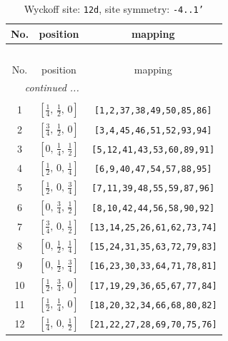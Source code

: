\documentclass[fleqn,8pt]{jsarticle}
\begin{document}
\begin{longtable}{ccc}
\caption{Wyckoff site: {\tt 12d}, site symmetry: {\tt -4..1'}}
 \\
 \hline \hline
No. & position & mapping \\ \hline \endfirsthead

\multicolumn{2}{l}{\tablename\ \thetable{}} \\
 \hline \hline
No. & position & mapping \\ \hline \endhead

 \hline \hline
\multicolumn{2}{r}{\footnotesize\it continued ...} \\ \endfoot

 \hline \hline
\multicolumn{2}{r}{} \\ \endlastfoot

1 & $\left[ \frac{1}{4},\, \frac{1}{2},\, 0 \right]$ & {\tt [1,2,37,38,49,50,85,86]} \\ \hline
2 & $\left[ \frac{3}{4},\, \frac{1}{2},\, 0 \right]$ & {\tt [3,4,45,46,51,52,93,94]} \\ \hline
3 & $\left[ 0,\, \frac{1}{4},\, \frac{1}{2} \right]$ & {\tt [5,12,41,43,53,60,89,91]} \\ \hline
4 & $\left[ \frac{1}{2},\, 0,\, \frac{1}{4} \right]$ & {\tt [6,9,40,47,54,57,88,95]} \\ \hline
5 & $\left[ \frac{1}{2},\, 0,\, \frac{3}{4} \right]$ & {\tt [7,11,39,48,55,59,87,96]} \\ \hline
6 & $\left[ 0,\, \frac{3}{4},\, \frac{1}{2} \right]$ & {\tt [8,10,42,44,56,58,90,92]} \\ \hline
7 & $\left[ \frac{3}{4},\, 0,\, \frac{1}{2} \right]$ & {\tt [13,14,25,26,61,62,73,74]} \\ \hline
8 & $\left[ 0,\, \frac{1}{2},\, \frac{1}{4} \right]$ & {\tt [15,24,31,35,63,72,79,83]} \\ \hline
9 & $\left[ 0,\, \frac{1}{2},\, \frac{3}{4} \right]$ & {\tt [16,23,30,33,64,71,78,81]} \\ \hline
10 & $\left[ \frac{1}{2},\, \frac{3}{4},\, 0 \right]$ & {\tt [17,19,29,36,65,67,77,84]} \\ \hline
11 & $\left[ \frac{1}{2},\, \frac{1}{4},\, 0 \right]$ & {\tt [18,20,32,34,66,68,80,82]} \\ \hline
12 & $\left[ \frac{1}{4},\, 0,\, \frac{1}{2} \right]$ & {\tt [21,22,27,28,69,70,75,76]} \\
\end{longtable}
\renewcommand{\arraystretch}{1.2}
\end{document}
